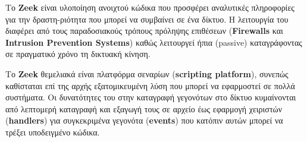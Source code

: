 Το \textbf{Zeek} είναι υλοποίηση ανοιχτού κώδικα που προσφέρει αναλυτικές πληροφορίες για την δραστη-ριότητα που μπορεί να συμβαίνει σε ένα δίκτυο. 
Η λειτουργία του διαφέρει από τους παραδοσιακούς τρόπους πρόληψης επιθέσεων (\textbf{Firewalls} και \textbf{Intrusion Prevention Systems}) καθώς λειτουργεί ήπια (passive) καταγράφοντας σε πραγματικό χρόνο τη δικτυακή κίνηση.

Το \textbf{Zeek} θεμελιακά είναι πλατφόρμα σεναρίων (\textbf{scripting platform}), συνεπώς καθίσταται επί της αρχής εξατομικευμένη λύση που μπορεί να εφαρμοστεί σε πολλά συστήματα. Οι δυνατότητες του στην καταγραφή γεγονότων στο δίκτυο κυμαίνονται από λεπτομερή καταγραφή και εξαγωγή τους σε αρχείο έως εφαρμογή χειριστών (\textbf{handlers}) για συγκεκριμένα γεγονότα (\textbf{events}) που κατόπιν αυτών μπορεί να τρέξει υποδειγμένο κώδικα.
